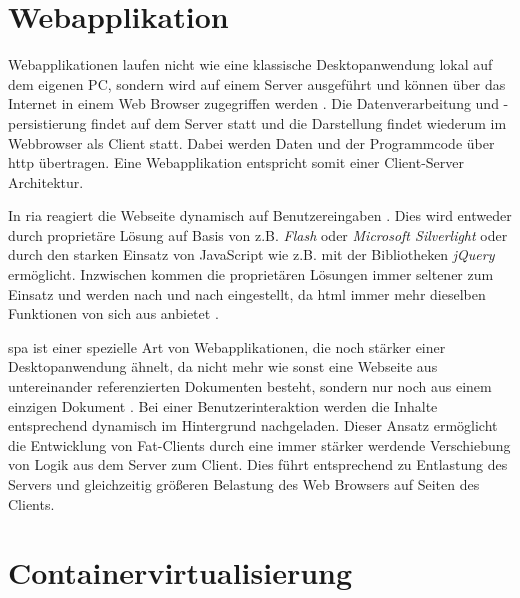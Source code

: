 \section{Webapplikation}
\label{sec:FUNDAMENTALS_WEB}

Webapplikationen laufen nicht wie eine klassische Desktopanwendung lokal auf dem eigenen PC, sondern wird auf einem Server ausgeführt und können über das Internet in einem Web Browser zugegriffen werden \cite{web_application}. Die Datenverarbeitung und -persistierung findet auf dem Server statt und die Darstellung findet wiederum im Webbrowser als Client statt. Dabei werden Daten und der Programmcode über \ac{http} übertragen. Eine Webapplikation entspricht somit einer Client-Server Architektur.

In \ac{ria} reagiert die Webseite dynamisch auf Benutzereingaben \cite{rich_internet_application}. Dies wird entweder durch proprietäre Lösung auf Basis von z.B. \textit{Flash} oder \textit{Microsoft Silverlight} oder durch den starken Einsatz von JavaScript wie z.B. mit der Bibliotheken \textit{jQuery} ermöglicht. Inzwischen kommen die proprietären Lösungen immer seltener zum Einsatz und werden nach und nach eingestellt, da \ac{html} immer mehr dieselben Funktionen von sich aus anbietet \cite{flash_end_of_life}.

\ac{spa} ist einer spezielle Art von Webapplikationen, die noch stärker einer Desktopanwendung ähnelt, da nicht mehr wie sonst eine Webseite aus untereinander referenzierten Dokumenten besteht, sondern nur noch aus einem einzigen Dokument \cite[S.~497]{javascript_definitive_guide}. Bei einer Benutzerinteraktion werden die Inhalte entsprechend dynamisch im Hintergrund nachgeladen. Dieser Ansatz ermöglicht die Entwicklung von Fat-Clients durch eine immer stärker werdende Verschiebung von Logik aus dem Server zum Client. Dies führt entsprechend zu Entlastung des Servers und gleichzeitig größeren Belastung des Web Browsers auf Seiten des Clients.

\section{Containervirtualisierung}
\label{sec:FUNDAMENTALS_CONTAINER}

